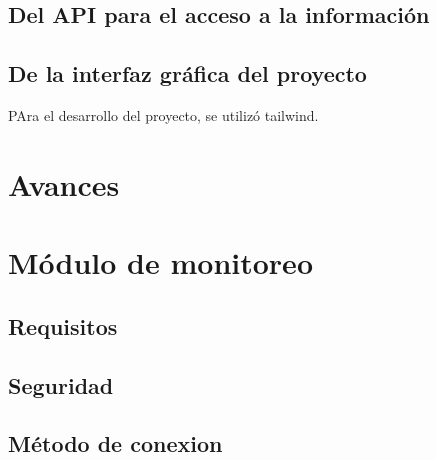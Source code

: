 \subsection{Del API para el acceso a la información}

\subsection{De la interfaz gráfica del proyecto}

PAra el desarrollo del proyecto, se utilizó tailwind.

\section{Avances}


\section{Módulo de monitoreo}

\subsection*{Requisitos}

\subsection*{Seguridad}

\subsection*{Método de conexion}
